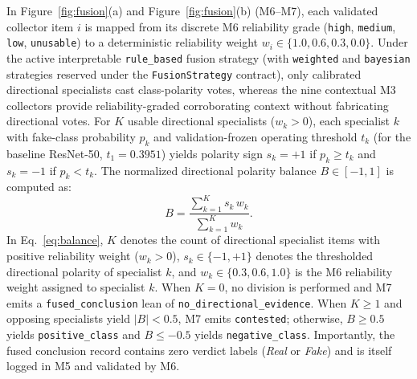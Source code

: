 \documentclass[final,5p,times,twocolumn,numafflabel]{elsarticle}
\begin{document}
In Figure~\ref{fig:fusion}(a) and Figure~\ref{fig:fusion}(b) (M6--M7), each validated collector item $i$ is mapped from its discrete M6 reliability grade (\texttt{high}, \texttt{medium}, \texttt{low}, \texttt{unusable}) to a deterministic reliability weight $w_i \in \{1.0, 0.6, 0.3, 0.0\}$. Under the active interpretable \texttt{rule\_based} fusion strategy (with \texttt{weighted} and \texttt{bayesian} strategies reserved under the \texttt{FusionStrategy} contract), only calibrated directional specialists cast class-polarity votes, whereas the nine contextual M3 collectors provide reliability-graded corroborating context without fabricating directional votes. For $K$ usable directional specialists ($w_k > 0$), each specialist $k$ with fake-class probability $p_k$ and validation-frozen operating threshold $t_k$ (for the baseline ResNet-50, $t_1 = 0.3951$) yields polarity sign $s_k = +1$ if $p_k \ge t_k$ and $s_k = -1$ if $p_k < t_k$. The normalized directional polarity balance $B \in [-1, 1]$ is computed as:
\begin{equation}
  B = \frac{\sum_{k=1}^{K} s_k \, w_k}{\sum_{k=1}^{K} w_k}.
  \label{eq:balance}
\end{equation}
In Eq.~\eqref{eq:balance}, $K$ denotes the count of directional specialist items with positive reliability weight ($w_k > 0$), $s_k \in \{-1, +1\}$ denotes the thresholded directional polarity of specialist $k$, and $w_k \in \{0.3, 0.6, 1.0\}$ is the M6 reliability weight assigned to specialist $k$. When $K = 0$, no division is performed and M7 emits a \texttt{fused\_conclusion} lean of \texttt{no\_directional\_evidence}. When $K \ge 1$ and opposing specialists yield $|B| < 0.5$, M7 emits \texttt{contested}; otherwise, $B \ge 0.5$ yields \texttt{positive\_class} and $B \le -0.5$ yields \texttt{negative\_class}. Importantly, the fused conclusion record contains zero verdict labels (\textit{Real} or \textit{Fake}) and is itself logged in M5 and validated by M6.
\end{document}
